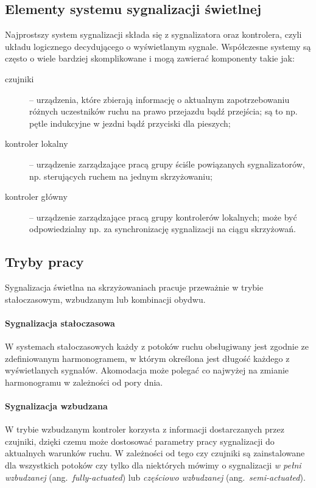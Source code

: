\documentclass{pracamgr}
\newcommand{\ang}[1]{(ang.~\emph{#1})}
\theoremstyle{plain}
\begin{document}
\subsection{Elementy systemu sygnalizacji świetlnej}
\label{ss:elementy} Najprostszy system sygnalizacji składa się z
sygnalizatora oraz kontrolera, czyli układu logicznego decydującego o
wyświetlanym sygnale. Współczesne systemy są często o wiele bardziej
skomplikowane i mogą zawierać komponenty takie jak:
\begin{description}
  \item[czujniki] -- urządzenia, które zbierają informację o aktualnym
  zapotrzebowaniu różnych uczestników ruchu na prawo przejazdu bądź
  przejścia; są to np. pętle indukcyjne w jezdni bądź
  przyciski dla pieszych;
  \item[kontroler lokalny] -- urządzenie zarządzające pracą grupy
  ściśle powiązanych sygnalizatorów, np. sterujących ruchem na jednym
  skrzyżowaniu;
  \item[kontroler główny] -- urządzenie zarządzające pracą grupy
  kontrolerów lokalnych; może być odpowiedzialny np. za synchronizację
  sygnalizacji na ciągu skrzyżowań.
\end{description}

\subsection{Tryby pracy}
\label{ss:tryby} Sygnalizacja świetlna na skrzyżowaniach pracuje
przeważnie w trybie stałoczasowym, wzbudzanym lub kombinacji obydwu.

\paragraph{Sygnalizacja stałoczasowa} W systemach stałoczasowych każdy
z potoków ruchu obsługiwany jest zgodnie ze zdefiniowanym
harmonogramem, w którym określona jest długość każdego z wyświetlanych
sygnałów. Akomodacja może polegać co najwyżej na zmianie harmonogramu
w zależności od pory dnia.

\paragraph{Sygnalizacja wzbudzana}
W trybie wzbudzanym kontroler korzysta z informacji dostarczanych
przez czujniki, dzięki czemu może dostosować parametry pracy
sygnalizacji do aktualnych warunków ruchu. W zależności od tego czy
czujniki są zainstalowane dla wszystkich potoków czy tylko dla
niektórych mówimy o sygnalizacji \emph{w pełni wzbudzanej}
\ang{fully-actuated} lub \emph{częściowo wzbudzanej}
\ang{semi-actuated}.
\end{document}
